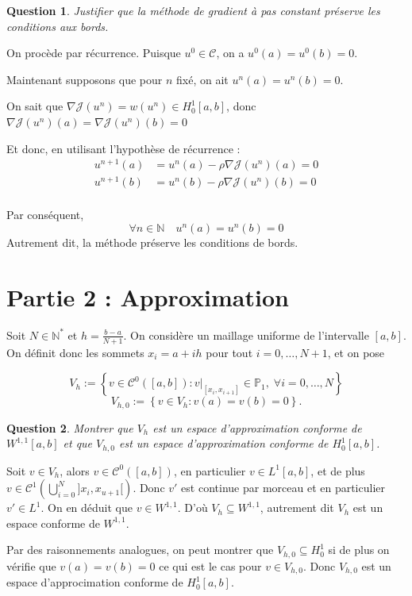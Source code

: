 \documentclass{article}
\newcommand{\Integer}{ \mathbb{N} }
\newcommand{\Set}[1]{ \left\{ #1 \right\} }
\newcommand{\FunctionClass}[2]{ \mathcal{C}^{#1} \left( #2 \right) }
\newtheorem{question}{Question}[subsection]
\newenvironment{answer}
  {\color{blue}}
  {}
\newcommand{\QuestionAnswer}[2]{
    \begin{question}
        #1
    \end{question}
    \begin{answer}
        #2
    \end{answer}
}
\newcommand{\SetC}{\mathcal{C}}
\newcommand{\FunctionJ}{\mathcal{J}}
\begin{document}
\QuestionAnswer{
    Justifier que la méthode de gradient à pas constant préserve les conditions
    aux bords.
}{
    On procède par récurrence.\newline
    Puisque $u^0 \in \SetC$, on a $u^0(a) = u^0(b) = 0$.

    Maintenant supposons que pour $n$ fixé, on ait $u^n(a)=u^n(b)=0$.

    On sait que $\nabla\FunctionJ(u^n) = w(u^n) \in H^1_0[a,b]$, donc $\nabla\FunctionJ(u^n)(a) = \nabla\FunctionJ(u^n)(b) = 0$

    Et donc, en utilisant l'hypothèse de récurrence :
    \begin{align*}
        u^{n+1}(a) &= u^n(a) - \rho\nabla\FunctionJ(u^n)(a) = 0 \\
        u^{n+1}(b) &= u^n(b) - \rho\nabla\FunctionJ(u^n)(b) = 0 \\
    \end{align*}
    
    Par conséquent,
    $$\forall n \in \Integer \quad u^n(a) = u^n(b) = 0$$
    Autrement dit, la méthode préserve les conditions de bords.
}


\newpage
\section{Partie 2 : Approximation}

Soit $N \in \Integer^*$ et $h = \frac{b-a}{N+1}$. On considère un maillage uniforme de l'intervalle $[a, b]$. On définit donc les sommets $x_i = a + ih$ pour tout $i = 0, \ldots, N+1$, et on pose

$$ V_h := \Set{ v \in \FunctionClass{0}{[a, b]} : v|_{[x_i,x_{i+1}]} \in \mathbb{P}_1, \; \forall i = 0, \ldots, N } $$
$$ V_{h,0} := \Set{ v \in V_h : v(a) = v(b) = 0 }.$$

\QuestionAnswer{
    Montrer que $V_h$ est un espace d'approximation conforme de $W^{1,1}[a, b]$ et que $V_{h,0}$ est un espace d'approximation conforme de $H^1_0[a, b]$.
}{
    Soit $v \in V_h$, alors $v \in \FunctionClass{0}{[a,b]}$, en particulier $v \in L^1[a,b]$, et de plus $v \in \FunctionClass{1}{\bigcup_{i=0}^N]x_i, x_{u+1}[}$. Donc $v'$ est continue par morceau et en particulier $v' \in L^1$. On en déduit que $v \in W^{1,1}$. D'où $V_h \subseteq W^{1,1}$, autrement dit $V_h$ est un espace conforme de $W^{1,1}$.

    Par des raisonnements analogues, on peut montrer que $V_{h,0} \subseteq H^1_0$ si de plus on vérifie que $v(a) = v(b) = 0$ ce qui est le cas pour $v \in V_{h,0}$. Donc $V_{h,0}$ est un espace d'approcimation conforme de $H^1_0[a, b]$.
}
\end{document}

